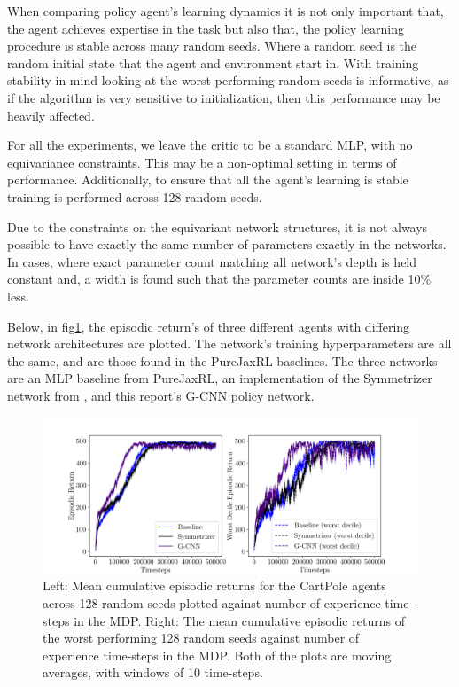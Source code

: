 When comparing policy agent's learning dynamics it is not only important that, the agent achieves expertise in the task but also that, the policy learning procedure is stable across many random seeds. Where a random seed is the random initial state that the agent and environment start in. With training stability in mind looking at the worst performing random seeds is informative, as if the algorithm is very sensitive to initialization, then this performance may be heavily affected.

For all the experiments, we leave the critic to be a standard MLP, with no equivariance constraints. This may be a non-optimal setting in terms of performance. Additionally, to ensure that all the agent's learning is stable training is performed across 128 random seeds.

Due to the constraints on the equivariant network structures, it is not always possible to have exactly the same number of parameters exactly in the networks. In cases, where exact parameter count matching all network's depth is held constant and, a width is found such that the parameter counts are inside 10\% less.

Below, in fig\ref{fig:cartpole_equivariant_actor}, the episodic return's of three different agents with differing network architectures are plotted. The network's training hyperparameters are all the same, and are those found in the PureJaxRL\cite{lu2022discovered} baselines. The three networks are an MLP baseline from PureJaxRL, an implementation of the Symmetrizer network from \cite{vanderpol2020mdp}, and this report's G-CNN policy network.
\begin{figure}[H]
	\centering
	\includegraphics[width=\linewidth]{Figures/cart_pole_returns.png}
	\caption{Left: Mean cumulative episodic returns for the CartPole agents across 128 random seeds plotted against number of experience time-steps in the MDP. Right: The mean cumulative episodic returns of the worst performing 128 random seeds against number of experience time-steps in the MDP. Both of the plots are moving averages, with windows of 10 time-steps. } \label{fig:cartpole_equivariant_actor}
\end{figure}

